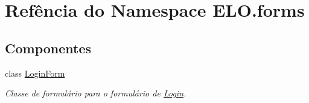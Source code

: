 \hypertarget{namespaceELO_1_1forms}{\section{Refência do Namespace E\-L\-O.\-forms}
\label{d6/d2a/namespaceELO_1_1forms}
}
\subsection*{Componentes}
\begin{DoxyCompactItemize}
\item 
class \hyperlink{classELO_1_1forms_1_1LoginForm}{Login\-Form}
\begin{DoxyCompactList}\small\item\em Classe de formulário para o formulário de \hyperlink{namespaceLogin}{Login}. \end{DoxyCompactList}\end{DoxyCompactItemize}
